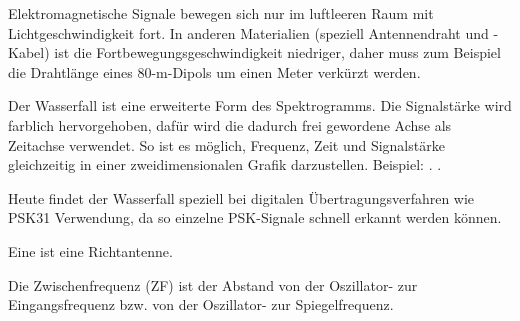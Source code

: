 {}

{Elektromagnetische Signale bewegen sich nur im luftleeren Raum mit Lichtgeschwindigkeit fort. In anderen Materialien (speziell Antennendraht und -Kabel) ist die Fortbewegungsgeschwindigkeit niedriger, daher muss zum Beispiel die Drahtlänge eines 80-m-Dipols um einen Meter verkürzt werden.}

{}

{Der Wasserfall ist eine erweiterte Form des Spektrogramms. Die Signalstärke wird farblich hervorgehoben, dafür wird die dadurch frei gewordene Achse als Zeitachse verwendet. So ist es möglich, Frequenz, Zeit und Signalstärke gleichzeitig in einer zweidimensionalen Grafik darzustellen.  Beispiel: . .

Heute findet der Wasserfall speziell bei digitalen Übertragungsverfahren wie PSK31 Verwendung, da so einzelne PSK-Signale schnell erkannt werden können.}

{Eine  ist eine Richtantenne.}

{Die Zwischenfrequenz (ZF) ist der Abstand von der Oszillator- zur Eingangsfrequenz bzw. von der Oszillator- zur Spiegel­fre­quenz.}